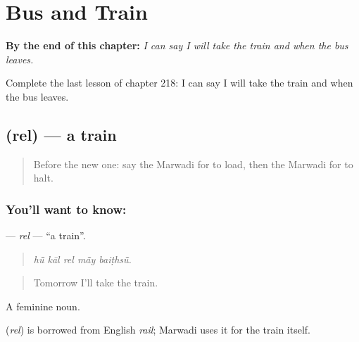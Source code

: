 
\chapter{Bus and Train}
\label{ch:mw-bus-and-train}

\begin{chapteropening}
\textbf{By the end of this chapter:} \emph{I can say I will take the train and when the bus leaves.}

Complete the last lesson of chapter 218: I can say I will take the train and when the bus leaves.
\end{chapteropening}

\section[\texorpdfstring{\mw{रेल} (rel)}{रेल (rel)}]{ (rel) — a train}

\label{lesson:MW-C218-rel}



\begin{quote}
Before the new one: say the Marwadi for to load, then the Marwadi for to halt.
\end{quote}

\subsection*{You'll want to know: }
\textbf{} — \emph{rel} — \textquotedblleft{}a train\textquotedblright{}.

\begin{quote}
    
\end{quote}

\begin{quote}
\emph{hū̃ kāl rel mā̃y baiṭhsū̃.}
\end{quote}

\begin{quote}
Tomorrow I'll take the train.
\end{quote}

A feminine noun.

\begin{cousinweb}
\textbf{} (\emph{rel}) is borrowed from English \emph{rail}; Marwadi uses it for the train itself.
\end{cousinweb}


